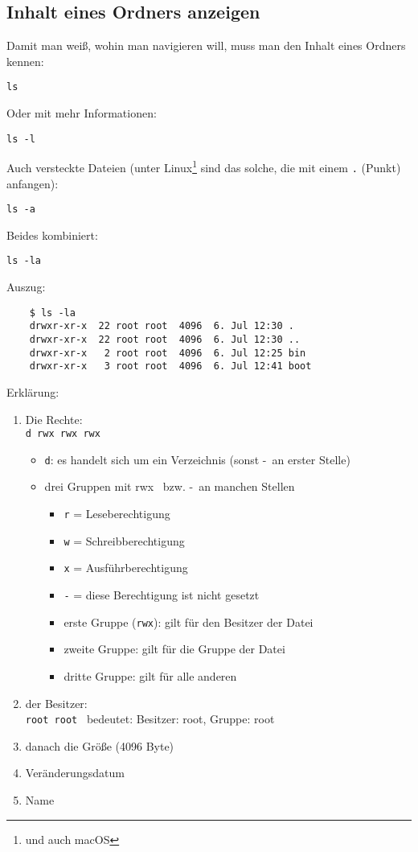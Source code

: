 \documentclass[a4paper,12pt]{article}
\begin{document}
\subsection{Inhalt eines Ordners anzeigen}
Damit man weiß, wohin man navigieren will, muss man den Inhalt eines 
Ordners kennen:  
\begin{lstlisting}
ls
\end{lstlisting} 
Oder mit mehr Informationen: 
\begin{lstlisting}
ls -l
\end{lstlisting} 
Auch versteckte Dateien (unter Linux\footnote{und auch macOS} sind das solche, die mit 
einem \texttt{.} (Punkt) anfangen):
\begin{lstlisting}
ls -a
\end{lstlisting} 
Beides kombiniert:
\begin{lstlisting}
ls -la
\end{lstlisting} 
Auszug: 
\begin{verbatim}
	$ ls -la
	drwxr-xr-x  22 root root  4096  6. Jul 12:30 .
	drwxr-xr-x  22 root root  4096  6. Jul 12:30 ..
	drwxr-xr-x   2 root root  4096  6. Jul 12:25 bin
	drwxr-xr-x   3 root root  4096  6. Jul 12:41 boot
\end{verbatim}
Erklärung: 
\begin{enumerate}
\item Die Rechte: \\
\texttt{d rwx rwx rwx}
\begin{itemize}
\item \texttt{d}: es handelt sich um ein Verzeichnis (sonst \glqq -\grqq ~an erster Stelle)
\item drei Gruppen mit \glqq rwx\grqq~ bzw. \glqq -\grqq ~an manchen Stellen
\begin{itemize}
\item \texttt{r} = Leseberechtigung
\item \texttt{w} = Schreibberechtigung
\item \texttt{x} = Ausführberechtigung
\item \texttt{-} = diese Berechtigung ist nicht gesetzt
\item erste Gruppe (\glqq \texttt{rwx}\grqq ): gilt für den Besitzer der Datei
\item zweite Gruppe: gilt für die Gruppe der Datei
\item dritte Gruppe: gilt für alle anderen
\end{itemize}
\end{itemize}
\item der Besitzer: \\
\texttt{root root} ~bedeutet: Besitzer: root, Gruppe: root
\item danach die Größe (4096 Byte)
\item Veränderungsdatum
\item Name
\end{enumerate}
\end{document}
